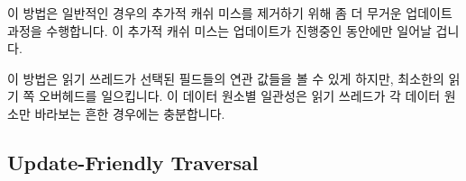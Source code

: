 {\begin{enumerate}
	\iffalse

	\item	Allocate a new \co{measurement} structure and place
		the new measurements into it.
	\item	Use \co{rcu_assign_pointer()} to point \co{->mp} to
		this new structure.
	\item	Wait for a grace period to elapse, for example using
		either \co{synchronize_rcu()} or \co{call_rcu()}.
	\item	Copy the measurements from the new \co{measurement}
		structure into the embedded \co{->meas} field.
	\item	Use \co{rcu_assign_pointer()} to point \co{->mp}
		back to the old embedded \co{->meas} field.
	\item	After another grace period elapses, free up the
		new \co{measurement} structure.

	\fi

	\end{enumerate}

	이 방법은 일반적인 경우의 추가적 캐쉬 미스를 제거하기 위해 좀 더 무거운
	업데이트 과정을 수행합니다.
	이 추가적 캐쉬 미스는 업데이트가 진행중인 동안에만 일어날 겁니다.

	\iffalse

	This approach uses a heavier weight update procedure to eliminate
	the extra cache miss in the common case.
	The extra cache miss will be incurred only while an update is
	actually in progress.

	\fi

}\QuickQuizEnd

이 방법은 읽기 쓰레드가 선택된 필드들의 연관 값들을 볼 수 있게 하지만, 최소한의
읽기 쪽 오버헤드를 일으킵니다.
이 데이터 원소별 일관성은 읽기 쓰레드가 각 데이터 원소만 바라보는 흔한 경우에는
충분합니다.

\iffalse

This approach enables readers to see correlated values for selected
fields, but while incurring minimal read-side overhead.
This per-data-element consistency suffices in the common case where
a reader looks only at a single data element.

\fi


\subsection{Update-Friendly Traversal}
\label{sec:together:Update-Friendly Traversal}

